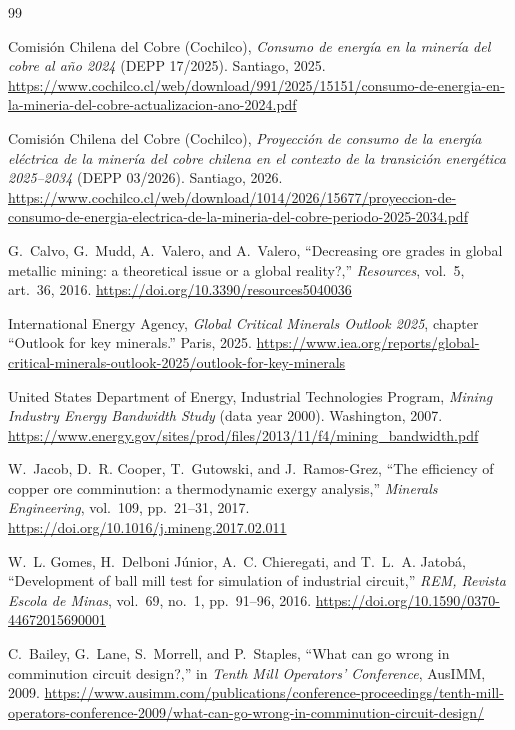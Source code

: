 \begin{thebibliography}{99}
\small

 Comisi\'on Chilena del Cobre (Cochilco), \emph{Consumo de energ\'ia en la miner\'ia del cobre al a\~no 2024} (DEPP 17/2025).
Santiago, 2025.
\url{https://www.cochilco.cl/web/download/991/2025/15151/consumo-de-energia-en-la-mineria-del-cobre-actualizacion-ano-2024.pdf}

 Comisi\'on Chilena del Cobre (Cochilco), \emph{Proyecci\'on de consumo de la energ\'ia el\'ectrica de la miner\'ia del cobre
chilena en el contexto de la transici\'on energ\'etica 2025--2034} (DEPP 03/2026). Santiago, 2026.
\url{https://www.cochilco.cl/web/download/1014/2026/15677/proyeccion-de-consumo-de-energia-electrica-de-la-mineria-del-cobre-periodo-2025-2034.pdf}

 G.~Calvo, G.~Mudd, A.~Valero, and A.~Valero, ``Decreasing ore grades in global metallic mining: a theoretical issue or a global
reality?,'' \emph{Resources}, vol.~5, art.~36, 2016. \url{https://doi.org/10.3390/resources5040036}

 International Energy Agency, \emph{Global Critical Minerals Outlook 2025}, chapter ``Outlook for key minerals.'' Paris, 2025.
\url{https://www.iea.org/reports/global-critical-minerals-outlook-2025/outlook-for-key-minerals}

 United States Department of Energy, Industrial Technologies Program, \emph{Mining Industry Energy Bandwidth Study} (data year 2000).
Washington, 2007. \url{https://www.energy.gov/sites/prod/files/2013/11/f4/mining_bandwidth.pdf}

 W.~Jacob, D.~R. Cooper, T.~Gutowski, and J.~Ramos-Grez, ``The efficiency of copper ore comminution: a thermodynamic exergy
analysis,'' \emph{Minerals Engineering}, vol.~109, pp.~21--31, 2017. \url{https://doi.org/10.1016/j.mineng.2017.02.011}

 W.~L. Gomes, H.~Delboni J\'unior, A.~C. Chieregati, and T.~L.~A. Jatob\'a, ``Development of ball mill test for simulation
of industrial circuit,'' \emph{REM, Revista Escola de Minas}, vol.~69, no.~1, pp.~91--96, 2016. \url{https://doi.org/10.1590/0370-44672015690001}

 C.~Bailey, G.~Lane, S.~Morrell, and P.~Staples, ``What can go wrong in comminution circuit design?,'' in \emph{Tenth Mill Operators'
Conference}, AusIMM, 2009.
\url{https://www.ausimm.com/publications/conference-proceedings/tenth-mill-operators-conference-2009/what-can-go-wrong-in-comminution-circuit-design/}


\end{thebibliography}
